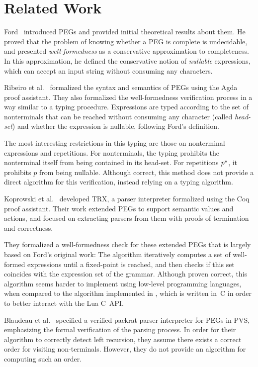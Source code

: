 \chapter{Related Work}
\label{chapter:related-work}

Ford~\cite{ford_parsing_2004} introduced PEGs
and provided initial theoretical results about them.
He proved that the problem of knowing whether
a PEG is complete is undecidable,
and presented \emph{well-formedness}
as a conservative approximation to completeness.
In this approximation,
he defined the conservative notion of \emph{nullable} expressions,
which can accept an input string without consuming any characters.

Ribeiro et al.~\cite{ribeiro_towards_2019}
formalized the syntax and semantics of PEGs
using the Agda proof assistant.
They also formalized the well-formedness verification process
in a way similar to a typing procedure.
Expressions are typed according to the set of nonterminals that can
be reached without consuming any character
(called \emph{head-set})
and whether the expression is nullable,
following Ford's definition.

The most interesting restrictions in this typing
are those on nonterminal expressions and repetitions.
For nonterminals, the typing
prohibits the nonterminal itself from being contained in its head-set.
For repetitions $p^\star$, it prohibits $p$ from being nullable.
Although correct, this method does not provide a direct algorithm for this verification, instead relying on a typing algorithm.

Koprowski et al.~\cite{koprowski_trx_2011} developed TRX,
a parser interpreter formalized using the Coq proof assistant.
Their work extended PEGs to support semantic values and actions,
and focused on extracting parsers from them
with proofs of termination and correctness.

They formalized a well-formedness check for these extended PEGs
that is largely based on Ford's original work:
The algorithm iteratively computes
a set of well-formed expressions
until a fixed-point is reached,
and then checks if this set
coincides with the expression set of the grammar.
Although proven correct,
this algorithm seems harder to implement
using low-level programming languages,
when compared to the algorithm implemented in \lpeg{},
which is written in~C in order to better interact with the Lua C~API.

Blaudeau et al.~\cite{blaudeau_verified_2020} specified
a verified packrat parser interpreter for PEGs in PVS,
emphasizing the formal verification of the parsing process.
In order for their algorithm to correctly detect left recursion,
they assume there exists a correct order for visiting non-terminals.
However, they do not provide an algorithm for computing such an order.


